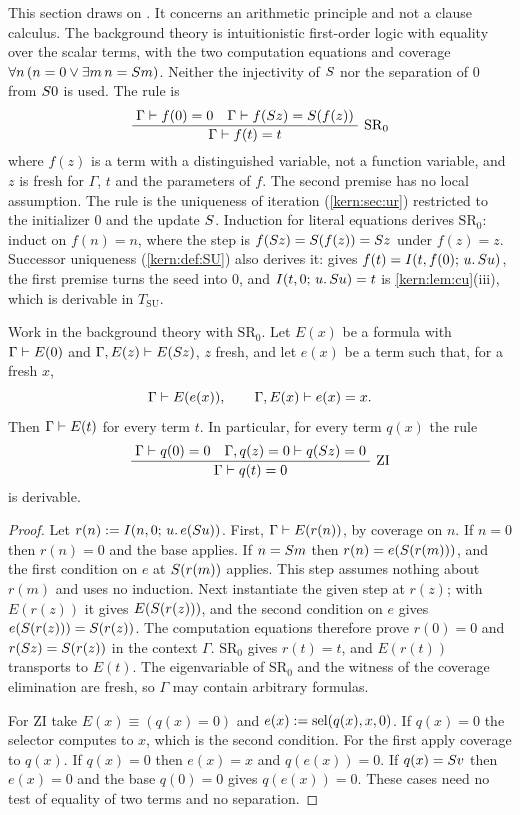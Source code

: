 This section draws on . It concerns an arithmetic
principle and not a clause calculus. The background theory is
intuitionistic first-order logic with equality over the scalar terms,
with the two computation equations and coverage
$\forall n\,(n=0\lor\exists m\,n=S m)$. Neither the injectivity of
$S$ nor the separation of $0$ from $S 0$ is used. The rule is
\[
 \dfrac{\;\Gamma\vdash f(0)=0\quad\Gamma\vdash f(S z)=S(f(z))\;}{\;\Gamma\vdash f(t)=t\;}\ \mathrm{SR}_0
\]
where $f(z)$ is a term with a distinguished variable, not a function
variable, and $z$ is fresh for $\Gamma$, $t$ and the parameters of $f$.
The second premise has no local assumption. The rule is the uniqueness of
iteration  (\cref{kern:sec:ur}) restricted to the initializer
$0$ and the update $S$. Induction for literal equations derives
$\mathrm{SR}_0$: induct on $f(n)=n$, where the step is
$f(S z)=S(f(z))=S z$ under $f(z)=z$. Successor uniqueness
 (\cref{kern:def:SU}) also derives it:  gives
$f(t)=I(t,f(0);\,u.\,S u)$, the first premise turns the seed into $0$,
and $I(t,0;\,u.\,S u)=t$ is \cref{kern:lem:cu}(iii), which is
derivable in $T_{\mathrm{SU}}$.

\begin{theorem}
\label{claus:thm:rigidity}
Work in the background theory with $\mathrm{SR}_0$. Let $E(x)$ be a
formula with $\Gamma\vdash E(0)$ and $\Gamma,E(z)\vdash E(S z)$, $z$
fresh, and let $e(x)$ be a term such that, for a fresh $x$,
\[
 \Gamma\vdash E(e(x)),\qquad \Gamma,E(x)\vdash e(x)=x .
\]
Then $\Gamma\vdash E(t)$ for every term $t$. In particular, for every
term $q(x)$ the rule
\[
 \dfrac{\;\Gamma\vdash q(0)=0\quad\Gamma,q(z)=0\vdash q(S z)=0\;}{\;\Gamma\vdash q(t)=0\;}\ \mathrm{ZI}
\]
is derivable.
\end{theorem}
\begin{proof}
Let $r(n)\mathrel{:=}I(n,0;\,u.\,e(S u))$. First, $\Gamma\vdash E(r(n))$,
by coverage on $n$. If $n=0$ then $r(n)=0$ and the base applies. If
$n=S m$ then $r(n)=e(S(r(m)))$, and the first condition on $e$ at
$S(r(m))$ applies. This step assumes nothing about $r(m)$ and uses no
induction. Next instantiate the given step at $r(z)$; with $E(r(z))$ it
gives $E(S(r(z)))$, and the second condition on $e$ gives
$e(S(r(z)))=S(r(z))$. The computation equations therefore prove
$r(0)=0$ and $r(S z)=S(r(z))$ in the context $\Gamma$.
$\mathrm{SR}_0$ gives $r(t)=t$, and $E(r(t))$ transports to $E(t)$. The
eigenvariable of $\mathrm{SR}_0$ and the witness of the coverage
elimination are fresh, so $\Gamma$ may contain arbitrary formulas.

For $\mathrm{ZI}$ take $E(x)\equiv(q(x)=0)$ and
$e(x)\mathrel{:=}\operatorname{sel}(q(x),x,0)$. If $q(x)=0$ the selector computes to $x$,
which is the second condition. For the first apply coverage to $q(x)$. If
$q(x)=0$ then $e(x)=x$ and $q(e(x))=0$. If $q(x)=S v$ then $e(x)=0$
and the base $q(0)=0$ gives $q(e(x))=0$. These cases need no test of
equality of two terms and no separation.
\end{proof}

